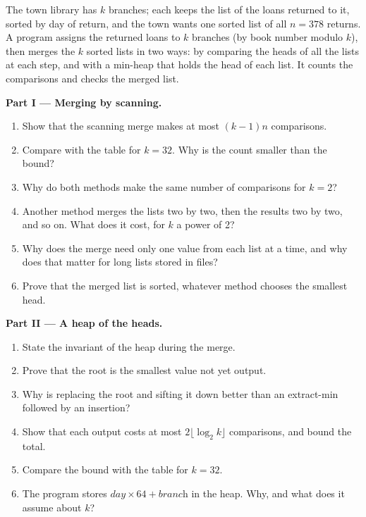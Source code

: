 \begin{problem}\label{pb:b1:heaps:1}
The town library has $k$ branches; each keeps the list of the loans returned to it, sorted by day of return, and the
town wants one sorted list of all $n = 378$ returns. A program assigns the returned loans to $k$ branches (by book number
modulo $k$), then merges the $k$ sorted lists in two ways: by comparing the heads of all the lists at each step, and
with a min-heap that holds the head of each list. It counts the comparisons and checks the merged list.
\label{out:b1:heaps:kmerge}
\label{out:b1:heaps:heights}

\medskip\noindent\textbf{Part I --- Merging by scanning.}
\begin{enumerate}
\item Show that the scanning merge makes at most $(k - 1)n$ comparisons.
\item Compare with the table for $k = 32$. Why is the count smaller than the bound?
\item Why do both methods make the same number of comparisons for $k = 2$?
\item Another method merges the lists two by two, then the results two by two, and so on. What does it cost, for $k$ a
power of 2?
\item Why does the merge need only one value from each list at a time, and why does that matter for long lists stored in
files?
\item Prove that the merged list is sorted, whatever method chooses the smallest head.
\end{enumerate}

\medskip\noindent\textbf{Part II --- A heap of the heads.}
\begin{enumerate}[resume]
\item State the invariant of the heap during the merge.
\item Prove that the root is the smallest value not yet output.
\item Why is replacing the root and sifting it down better than an extract-min followed by an insertion?
\item Show that each output costs at most $2 \lfloor \log_2 k \rfloor$ comparisons, and bound the total.
\item Compare the bound with the table for $k = 32$.
\item The program stores $\textit{day} \times 64 + \textit{branch}$ in the heap. Why, and what does it assume about $k$?
\end{enumerate}


\end{problem}
